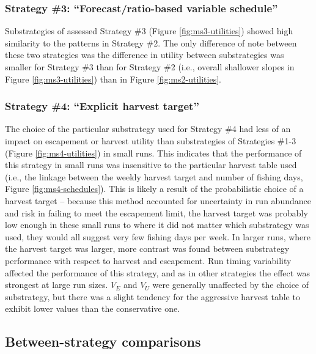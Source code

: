 \documentclass[12pt,]{book}
\theoremstyle{definition}
\theoremstyle{definition}
\theoremstyle{definition}
\theoremstyle{remark}
\begin{document}
\subsubsection{\texorpdfstring{Strategy \#3: ``Forecast/ratio-based
variable
schedule''}{Strategy \#3: Forecast/ratio-based variable schedule}}\label{strategy-3-forecastratio-based-variable-schedule-1}

\noindent
Substrategies of assessed Strategy \#3 (Figure \ref{fig:ms3-utilities})
showed high similarity to the patterns in Strategy \#2. The only
difference of note between these two strategies was the difference in
utility between substrategies was smaller for Strategy \#3 than for
Strategy \#2 (i.e., overall shallower slopes in Figure
\ref{fig:ms3-utilities}) than in Figure \ref{fig:ms2-utilities}.

\subsubsection{\texorpdfstring{Strategy \#4: ``Explicit harvest
target''}{Strategy \#4: Explicit harvest target}}\label{strategy-4-explicit-harvest-target-1}

\noindent
The choice of the particular substrategy used for Strategy \#4 had less
of an impact on escapement or harvest utility than substrategies of
Strategies \#1-3 (Figure \ref{fig:ms4-utilities}) in small runs. This
indicates that the performance of this strategy in small runs was
insensitive to the particular harvest table used (i.e., the linkage
between the weekly harvest target and number of fishing days, Figure
\ref{fig:ms4-schedules}). This is likely a result of the probabilistic
choice of a harvest target -- because this method accounted for
uncertainty in run abundance and risk in failing to meet the escapement
limit, the harvest target was probably low enough in these small runs to
where it did not matter which substrategy was used, they would all
suggest very few fishing days per week. In larger runs, where the
harvest target was larger, more contrast was found between substrategy
performance with respect to harvest and escapement. Run timing
variability affected the performance of this strategy, and as in other
strategies the effect was strongest at large run sizes. \(V_E\) and
\(V_U\) were generally unaffected by the choice of substrategy, but
there was a slight tendency for the aggressive harvest table to exhibit
lower values than the conservative one.

\subsection{Between-strategy
comparisons}\label{between-strategy-comparisons-1}
\end{document}
